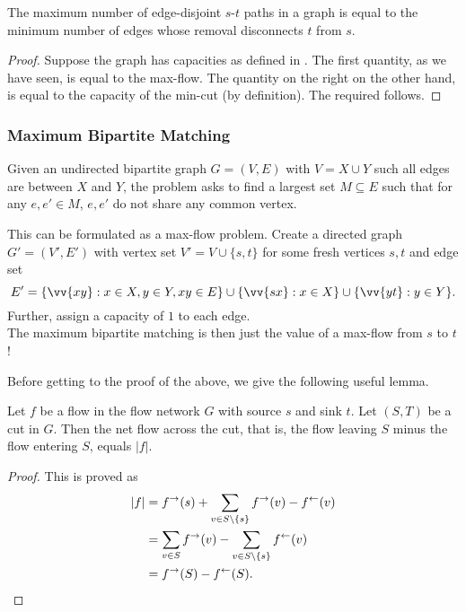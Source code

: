 		\begin{theorem}
			The maximum number of edge-disjoint $s$-$t$ paths in a graph is equal to the minimum number of edges whose removal disconnects $t$ from $s$.
		\end{theorem}
		\begin{proof}
			Suppose the graph has capacities as defined in . The first quantity, as we have seen, is equal to the max-flow. The quantity on the right on the other hand, is equal to the capacity of the min-cut (by definition). The required follows.
		\end{proof}

	\subsubsection{Maximum Bipartite Matching}

		Given an undirected bipartite graph $G=(V,E)$ with $V=X\cup Y$ such all edges are between $X$ and $Y$, the problem asks to find a largest set $M\subseteq E$ such that for any $e,e'\in M$, $e,e'$ do not share any common vertex.

		This can be formulated as a max-flow problem. Create a directed graph $G' = (V',E')$ with vertex set $V' = V\cup\{s,t\}$ for some fresh vertices $s,t$ and edge set
		\[ E' = \{\vv{xy}: x\in X, y\in Y, xy\in E\} \cup \{\vv{sx} : x\in X\} \cup \{\vv{yt} : y\in Y\}. \]
		Further, assign a capacity of $1$ to each edge.\\
		The maximum bipartite matching is then just the value of a max-flow from $s$ to $t$!

		Before getting to the proof of the above, we give the following useful lemma.

		\begin{lemma}
			\label{lem: max bi match}
			Let $f$ be a flow in the flow network $G$ with source $s$ and sink $t$. Let $(S,T)$ be a cut in $G$. Then the net flow across the cut, that is, the flow leaving $S$ minus the flow entering $S$, equals $|f|$.
		\end{lemma}
		\begin{proof}
			This is proved as
			\begin{align*}
				|f| &= f^\to(s) + \sum_{v\in S\setminus\{s\}} f^\to(v) - f^\leftarrow(v) \\
					&= \sum_{v\in S} f^\to(v) - \sum_{v\in S\setminus\{s\}} f^\leftarrow(v) \\
					&= f^\to(S) - f^\leftarrow(S).\qedhere
			\end{align*}
		\end{proof}

